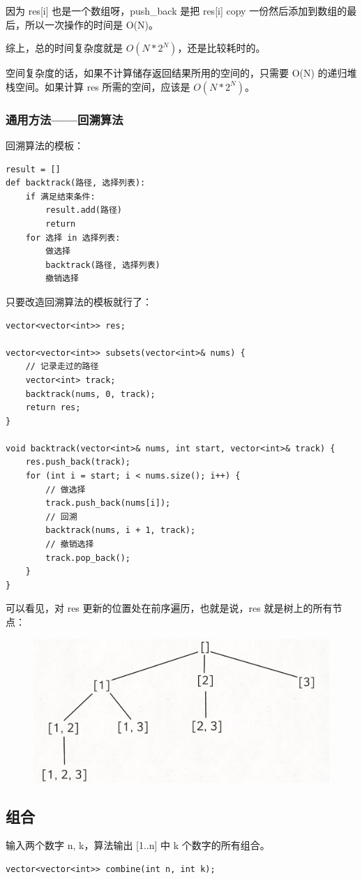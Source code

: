 \documentclass[12pt]{article}
\begin{document}
因为 res[i] 也是一个数组呀，push\_back 是把 res[i] copy 一份然后添加到数组的最后，所以一次操作的时间是 O(N)。

综上，总的时间复杂度就是 $O(N*2^N)$，还是比较耗时的。

空间复杂度的话，如果不计算储存返回结果所用的空间的，只需要 O(N) 的递归堆栈空间。如果计算 res 所需的空间，应该是 $O(N*2^N)$。

\subsubsection{通用方法——回溯算法}
回溯算法的模板：
\begin{lstlisting}
result = []
def backtrack(路径, 选择列表):
    if 满足结束条件:
        result.add(路径)
        return
    for 选择 in 选择列表:
        做选择
        backtrack(路径, 选择列表)
        撤销选择
\end{lstlisting}

只要改造回溯算法的模板就行了：
\begin{lstlisting}
vector<vector<int>> res;

vector<vector<int>> subsets(vector<int>& nums) {
    // 记录走过的路径
    vector<int> track;
    backtrack(nums, 0, track);
    return res;
}

void backtrack(vector<int>& nums, int start, vector<int>& track) {
    res.push_back(track);
    for (int i = start; i < nums.size(); i++) {
        // 做选择
        track.push_back(nums[i]);
        // 回溯
        backtrack(nums, i + 1, track);
        // 撤销选择
        track.pop_back();
    }
}
\end{lstlisting}

可以看见，对 res 更新的位置处在前序遍历，也就是说，res 就是树上的所有节点：
\begin{figure}[H]
    \centering
    \includegraphics[width=.6\textwidth]{fig/Subset.png}
\end{figure}

\subsection{组合}
输入两个数字 n, k，算法输出 [1..n] 中 k 个数字的所有组合。
\begin{lstlisting}
vector<vector<int>> combine(int n, int k);
\end{lstlisting}
\end{document}
